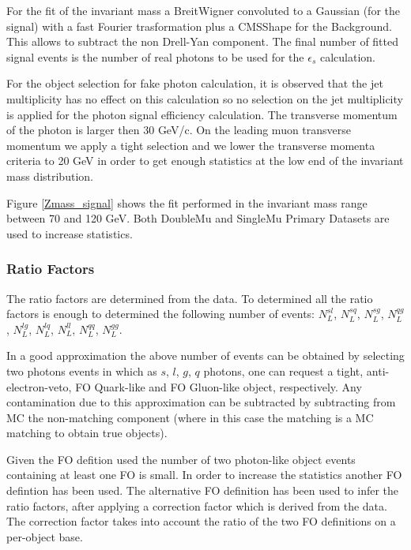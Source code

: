 \documentclass[12pt,oneandhalf,chaparabic,phys,ms,eng]{metu}
\begin{document}
For the fit of the invariant mass a BreitWigner convoluted to a Gaussian (for the signal) with a fast Fourier trasformation plus a CMSShape for the Background. This allows to subtract the non Drell-Yan component. The final 
number of fitted signal events is the number of real photons to be used for the  $\epsilon_{s}$ calculation.

For the object selection for fake photon calculation, it is observed that the jet multiplicity has no effect on this calculation so no selection on the jet multiplicity is applied for the photon signal efficiency calculation. The transverse momentum of the photon is larger then 30 GeV/c. On the leading muon transverse momentum we apply a tight selection and we lower the transverse momenta criteria to 20 GeV in order to get enough statistics at the low end of the invariant mass distribution. 

Figure \ref{Zmass_signal} shows the fit performed in the invariant mass range between 70 and 120 GeV. Both DoubleMu and SingleMu Primary Datasets are used to increase statistics.

\subsubsection{Ratio Factors}

The ratio factors are determined from the data. To determined all the ratio factors is enough to determined the following number of events: $N^{sl}_{L}$, $N^{sq}_{L}$, $N^{sg}_{L}$, $N^{qg}_{L}$, $N^{lg}_{L}$, $N^{lq}_{L}$, 
$N^{ll}_{L}$, 
$N^{qq}_{L}$, $N^{gg}_{L}$. 

In a good approximation the above number of events can be obtained by selecting two photons events in which as $s$, $l$, $g$, $q$ photons, one can request a tight, anti-electron-veto, FO Quark-like and FO Gluon-like object, 
respectively. 
Any contamination due to this approximation can be subtracted by subtracting from MC the non-matching component (where in this case the matching is a MC matching to obtain true objects). 

Given the FO defition used the number of two photon-like object events containing at least one FO is small. In order to increase the statistics another FO defintion has been used. The alternative FO definition has been used to 
infer the ratio factors, after applying a correction factor which is derived from the data. The correction factor takes into account the ratio of the two FO definitions on a per-object base.  
\end{document}
